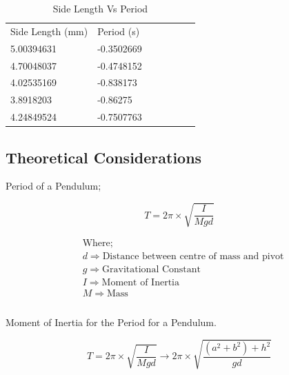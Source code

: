 \documentclass[12pt]{article}
\begin{document}
\begin{multicols}{2}
\begin{table}[H]
\centering
\caption{Side Length Vs Period}
\label{Side Length Vs Period}
\begin{tabular}{lllllll}
Side Length (mm) & Period (s) \\
5.00394631              & -0.3502669                     \\
4.70048037              & -0.4748152                     \\
4.02535169               & -0.838173                     \\
3.8918203               & -0.86275                     \\
4.24849524               & -0.7507763                    
\end{tabular}
\end{table}

\end{multicols}


\pagebreak
\subsection{Theoretical Considerations}
\label{Theoretical Considerations SubSection}

Period of a Pendulum;

\begin{equation} \label{Period for Pendulum}
{T = 2\pi \times \sqrt{\dfrac{I}{Mgd}}}
\end{equation}

\begin{equation*}
\begin{split}
&\text{Where;} \\
&d \Rightarrow \text{Distance between centre of mass and pivot} \\
&g \Rightarrow \text{Gravitational Constant} \\
&I \Rightarrow \text{Moment of Inertia} \\
&M \Rightarrow \text{Mass} \\
\end{split}
\end{equation*} \\

Moment of Inertia for the Period for a Pendulum.

\begin{equation} \label{Moment of inertia for the period for a pendulum}
{T = 2\pi \times \sqrt{\dfrac{I}{Mgd}} \rightarrow 2\pi \times \sqrt{\dfrac{(a^2 + b^2)+h^2}{gd}}}
\end{equation} \\
\end{document}
